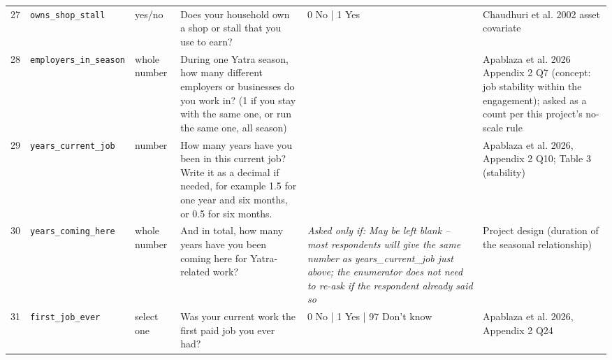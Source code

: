 \documentclass[9pt,a4paper,landscape]{article}
\begin{document}
\begin{longtable}{@{}p{0.5cm}p{3.3cm}p{1.7cm}p{7.3cm}p{5.6cm}p{5.4cm}@{}}
\footnotesize 27 & \footnotesize\texttt{owns\_shop\_stall} & \scriptsize yes/no & \footnotesize Does your household own a shop or stall that you use to earn?\par\vspace{1pt}{\footnotesize\color{hdr}{\hifont क्या आपके घर की अपनी दुकान या खोखा है जिससे आप कमाते हैं?}} & \scriptsize 0 No | 1 Yes & \scriptsize Chaudhuri et al. 2002 asset covariate\\
\footnotesize 28 & \footnotesize\texttt{employers\_in\_season} & \scriptsize whole number & \footnotesize During one Yatra season, how many different employers or businesses do you work in? (1 if you stay with the same one, or run the same one, all season)\par\vspace{1pt}{\footnotesize\color{hdr}{\hifont एक यात्रा सीज़न में आप कितने अलग-अलग मालिकों के पास या कितने अलग-अलग कामों में काम करते हैं? (अगर पूरे सीज़न एक ही जगह रहते हैं या अपना एक ही काम चलाते हैं, तो 1 लिखें)}} & \scriptsize  & \scriptsize Apablaza et al. 2026 Appendix 2 Q7 (concept: job stability within the engagement); asked as a count per this project's no-scale rule\\
\footnotesize 29 & \footnotesize\texttt{years\_current\_job} & \scriptsize number & \footnotesize How many years have you been in this current job? Write it as a decimal if needed, for example 1.5 for one year and six months, or 0.5 for six months.\par\vspace{1pt}{\footnotesize\color{hdr}{\hifont अगर एक साल या ज़्यादा: आप इस काम में कितने साल से हैं? दशमलव में लिखें, जैसे डेढ़ साल के लिए 1.5।}} & \scriptsize  & \scriptsize Apablaza et al. 2026, Appendix 2 Q10; Table 3 (stability)\\
\footnotesize 30 & \footnotesize\texttt{years\_coming\_here} & \scriptsize whole number & \footnotesize And in total, how many years have you been coming here for Yatra-related work?\par\vspace{1pt}{\footnotesize\color{hdr}{\hifont और कुल मिलाकर, आप कितने सालों से यहाँ यात्रा से जुड़ा काम करने आ रहे हैं? (अगर पिछले सवाल जैसा ही जवाब है, तो वही लिख सकते हैं)}} & \scriptsize \textit{Asked only if: May be left blank -- most respondents will give the same number as years\_current\_job just above; the enumerator does not need to re-ask if the respondent already said so} & \scriptsize Project design (duration of the seasonal relationship)\\
\footnotesize 31 & \footnotesize\texttt{first\_job\_ever} & \scriptsize select one & \footnotesize Was your current work the first paid job you ever had?\par\vspace{1pt}{\footnotesize\color{hdr}{\hifont क्या यह आपका पहला पैसे वाला काम है?}} & \scriptsize 0 No | 1 Yes | 97 Don't know & \scriptsize Apablaza et al. 2026, Appendix 2 Q24\\

\end{longtable}
\end{document}
